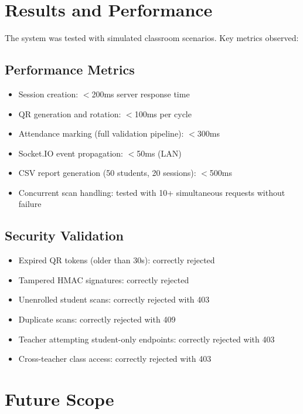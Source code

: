 \documentclass[conference]{IEEEtran}
\begin{document}
\section{Results and Performance}

The system was tested with simulated classroom scenarios. Key metrics observed:

\subsection{Performance Metrics}
\begin{itemize}
\item Session creation: $<$200ms server response time
\item QR generation and rotation: $<$100ms per cycle
\item Attendance marking (full validation pipeline): $<$300ms
\item Socket.IO event propagation: $<$50ms (LAN)
\item CSV report generation (50 students, 20 sessions): $<$500ms
\item Concurrent scan handling: tested with 10+ simultaneous requests without failure
\end{itemize}

\subsection{Security Validation}
\begin{itemize}
\item Expired QR tokens (older than 30s): correctly rejected
\item Tampered HMAC signatures: correctly rejected
\item Unenrolled student scans: correctly rejected with 403
\item Duplicate scans: correctly rejected with 409
\item Teacher attempting student-only endpoints: correctly rejected with 403
\item Cross-teacher class access: correctly rejected with 403
\end{itemize}

\section{Future Scope}
\end{document}
